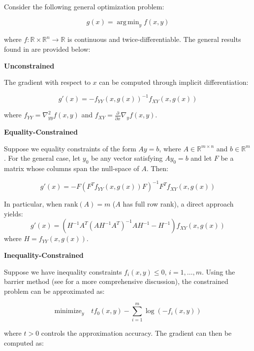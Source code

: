 \documentclass{article}
\DeclareMathOperator*{\argmin}{arg\,min}
\begin{document}
Consider the following general optimization problem: 

\begin{equation}
g(x) = \argmin_{y} f(x,y)
\end{equation}

where $f: \mathbb{R} \times \mathbb{R}^n \rightarrow \mathbb{R}$ is continuous and twice-differentiable. The general results found in \citep{gould2016differentiating} are provided below:

\textbf{Unconstrained} 

The gradient with respect to $x$ can be computed through implicit differentiation:

\begin{equation}
g'(x) = -f_{YY}(x,g(x))^{-1}f_{XY}(x,g(x))
\end{equation}

where $f_{YY} = \nabla^2_{yy}f(x,y)$ and $f_{XY} = \frac{\partial}{\partial x}\nabla_y f(x,y)$.

\textbf{Equality-Constrained}

Suppose we equality constraints of the form $Ay = b$, where $A \in \mathbb{R}^{m \times n}$ and $b \in \mathbb{R}^m$. For the general case, let $y_0$ be any vector satisfying $Ay_0 = b$ and let $F$ be a matrix whose columns span the null-space of $A$. Then:

\begin{equation}
g'(x) = -F(F^T f_{YY}(x,g(x))F)^{-1}F^T f_{XY}(x,g(x))
\end{equation}

In particular, when $\text{rank}(A) = m$ ($A$ has full row rank), a direct approach yields:
\begin{equation}
g'(x) = (H^{-1}A^T(AH^{-1}A^T)^{-1}AH^{-1} - H^{-1})f_{XY}(x,g(x))
\end{equation}
where $H = f_{YY}(x,g(x))$. 

\textbf{Inequality-Constrained}

Suppose we have inequality constraints $f_i(x,y) \leq 0$, $i=1,\ldots,m$. Using the barrier method (see \citep{boyd2004convex} for a more comprehensive discussion), the constrained problem can be approximated as:

\begin{equation}
\text{minimize}_y \quad tf_0(x,y) - \sum_{i=1}^m \log(-f_i(x,y))
\end{equation}

where $t > 0$ controls the approximation accuracy. The gradient can then be computed as:
\end{document}
